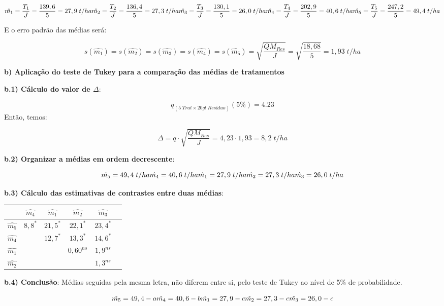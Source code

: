 \documentclass[
]{book}
\begin{document}
\[
\hat{m_1} = \frac{T_1}{J} = \frac{139,6}{5} = 27,9\;t/ha\\
\hat{m_2} = \frac{T_2}{J}= \frac{136,4}{5} = 27,3\;t/ha\\
\hat{m_3} = \frac{T_3}{J}= \frac{130,1}{5} = 26,0\;t/ha\\
\hat{m_4} = \frac{T_4}{J}= \frac{202,9}{5} = 40,6\;t/ha\\
\hat{m_5} =\frac{T_5}{J}= \frac{247,2}{5} = 49,4\;t/ha
\]

E o erro padrão das médias será:

\[
s(\hat{m_1}) = s(\hat{m_2})=s(\hat{m_3})=s(\hat{m_4})=s(\hat{m_5})= \sqrt{\frac{QM_{Res}}{J}} = \sqrt{\frac{18,68}{5}} = 1,93 \; t/ha 
\]

\textbf{b) Aplicação do teste de Tukey para a comparação das médias de tratamentos}

\textbf{b.1) Cálculo do valor de \(\Delta\)}:

\[
q_{(5\;Trat \times 20 gl\;Resíduo)}(5\%) = 4.23
\]
Então, temos:

\[
\Delta = q \cdot \sqrt{\frac{QM_{Res}}{J}} = 4,23 \cdot 1,93 = 8,2\;t/ha
\]

\textbf{b.2) Organizar a médias em ordem decrescente}:

\[
\hat{m_5} = 49,4\;t/ha\\
\hat{m_4} = 40,6\;t/ha\\
\hat{m_1} = 27,9\;t/ha\\
\hat{m_2} = 27,3\;t/ha\\
\hat{m_3} = 26,0\;t/ha
\]

\textbf{b.3) Cálculo das estimativas de contrastes entre duas médias}:

\begin{longtable}[]{@{}cccccc@{}}
\toprule
& \(\hat{m_4}\) & \(\hat{m_1}\) & \(\hat{m_2}\) & \(\hat{m_3}\) &\tabularnewline
\midrule
\endhead
\(\hat{m_5}\) & \(8,8^{*}\) & \(21,5^{*}\) & \(22,1^{*}\) & \(23,4^{*}\) &\tabularnewline
\(\hat{m_4}\) & & \(12,7^{*}\) & \(13,3^{*}\) & \(14,6^{*}\) &\tabularnewline
\(\hat{m_1}\) & & & \(0,60^{ns}\) & \(1,9^{ns}\) &\tabularnewline
\(\hat{m_2}\) & & & & \(1,3^{ns}\) &\tabularnewline
\bottomrule
\end{longtable}

\textbf{b.4) Conclusão}: Médias seguidas pela mesma letra, não diferem entre si, pelo teste de Tukey ao nível de 5\% de probabilidade.

\[
\hat{m_5} = 49,4-a\\
\hat{m_4} = 40,6-b\\
\hat{m_1} = 27,9-c\\
\hat{m_2} = 27,3-c\\
\hat{m_3} = 26,0-c
\]
\end{document}
